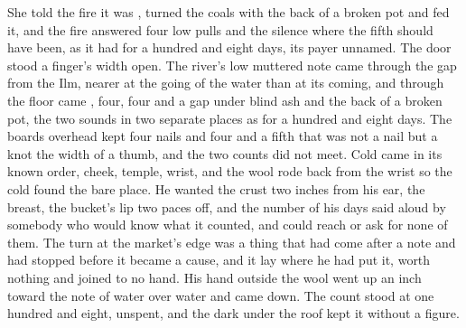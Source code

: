 She told the fire it was , turned the coals with the back of a broken pot and fed it, and the fire answered four low pulls and the silence where the fifth should have been, as it had for a hundred and eight days, its payer unnamed. The door stood a finger's width open. The river's low muttered note came through the gap from the Ilm, nearer at the going of the water than at its coming, and through the floor came , four, four and a gap under blind ash and the back of a broken pot, the two sounds in two separate places as for a hundred and eight days. The boards overhead kept four nails and four and a fifth that was not a nail but a knot the width of a thumb, and the two counts did not meet. Cold came in its known order, cheek, temple, wrist, and the wool rode back from the wrist so the cold found the bare place. He wanted the crust two inches from his ear, the breast, the bucket's lip two paces off, and the number of his days said aloud by somebody who would know what it counted, and could reach or ask for none of them. The turn at the market's edge was a thing that had come after a note and had stopped before it became a cause, and it lay where he had put it, worth nothing and joined to no hand. His hand outside the wool went up an inch toward the note of water over water and came down. The count stood at one hundred and eight, unspent, and the dark under the roof kept it without a figure.
